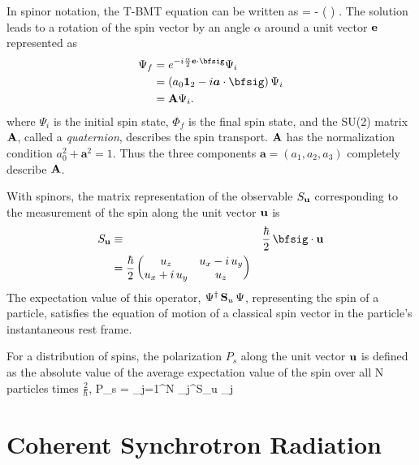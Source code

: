In spinor notation, the T-BMT equation can be written as
  \Begineq   
     \Psi = -  \left( \bfsig \cdot   
    {\pmb\Omega} \right) \Psi.   
  \Endeq   
The solution leads to a rotation of the spin vector by an angle   
$\alpha$ around a unit vector ${\bf e}$ represented as   
  \begin{align}   
    \Psi_f &= e^{-i \frac{\alpha}{2} \Bf e \cdot \bfsig} \Psi_i \CRNO
         &= \left( a_{0} \Bf 1_{2} - i \boldsymbol{a} \cdot \bfsig \right) \Psi_i \\
         &= \Bf A \Psi_i. \nonumber
  \end{align}   
where $\Psi_i$ is the initial spin state, $\Phi_f$ is the final spin
state, and the SU(2) matrix ${\bf A}$, called a \textit{quaternion},
describes the spin transport. ${\bf A}$ has the normalization condition
$a_{0}^{2} + \boldsymbol{a}^{2} = 1$. Thus the three components
$\boldsymbol{a} = \left(a_{1}, a_{2}, a_{3}\right)$ completely
describe ${\bf A}$. 

With spinors, the matrix representation of the observable $S_{{\bf u}}$
corresponding to the measurement of the spin along the unit vector
${\bf u}$ is
\begin{align}
  S_{\Bf u} &\equiv& \frac{\hbar}{2} \, \bfsig \cdot \Bf u \\   
            &= \frac{\hbar}{2} 
                   \begin{pmatrix} 
                     u_z            & u_x - i \, u_y \\
                     u_x + i \, u_y & u_z
                   \end{pmatrix}
\end{align}
The expectation value of this operator, $\Psi^\dagger \, {\bf S}_u \,
\Psi$, representing the spin of a particle, satisfies the equation of
motion of a classical spin vector in the particle's instantaneous rest
frame.

For a distribution of spins, the polarization $P_s$ along the unit
vector ${\bf u}$ is defined as the absolute value of the average
expectation value of the spin over all N particles times
$\frac{2}{\hbar}$,
  \Begineq
    P_s =   \sum_{j=1}^{N} \Psi_j^\dagger S_{\Bf u} \Psi_j
  \Endeq  

\section{Coherent Synchrotron Radiation}
\label{s:csr}   

